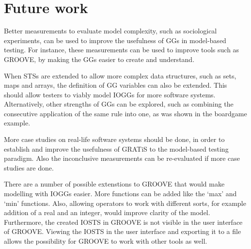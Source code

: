\section{Future work}\label{sec:future-work}
Better measurements to evaluate model complexity, such as sociological experiments, can be used to improve the usefulness of GGs in model-based testing. For instance, these measurements can be used to improve tools such as GROOVE, by making the GGs easier to create and understand.

When STSs are extended to allow more complex data structures, such as sets, maps and arrays, the definition of GG variables can also be extended. This should allow testers to viably model IOGGs for more software systems. Alternatively, other strengths of GGs can be explored, such as combining the consecutive application of the same rule into one, as was shown in the boardgame example.

More case studies on real-life software systems should be done, in order to establish and improve the usefulness of GRATiS to the model-based testing paradigm. Also the inconclusive measurements can be re-evaluated if more case studies are done.

There are a number of possible extenstions to GROOVE that would make modelling with IOGGs easier. More functions can be added like the `max' and `min' functions. Also, allowing operators to work with different sorts, for example addition of a real and an integer, would improve clarity of the model. Furthermore, the created IOSTS in GROOVE is not visible in the user interface of GROOVE. Viewing the IOSTS in the user interface and exporting it to a file allows the possibility for GROOVE to work with other tools as well.